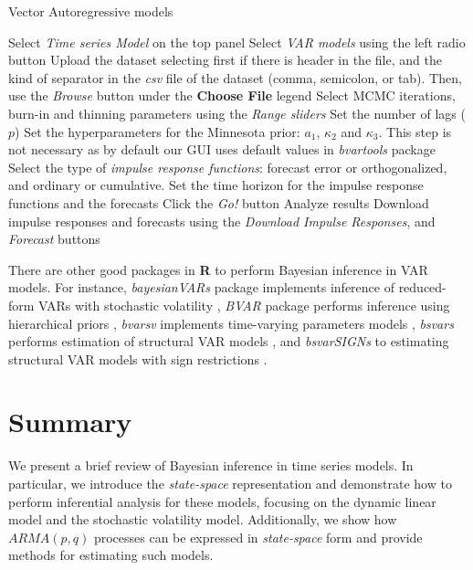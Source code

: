 \begin{algorithm}[h!]
	\caption{Vector Autoregressive models}\label{alg:VAR}
	\begin{algorithmic}[1]  		 			
		\State Select \textit{Time series Model} on the top panel
		\State Select \textit{VAR models} using the left radio button
		\State Upload the dataset selecting first if there is header in the file, and the kind of separator in the \textit{csv} file of the dataset (comma, semicolon, or tab). Then, use the \textit{Browse} button under the \textbf{Choose File} legend
		\State Select MCMC iterations, burn-in and thinning parameters using the \textit{Range sliders}
		\State Set the number of lags ($p$)
		\State Set the hyperparameters for the Minnesota prior: $a_1$, $\kappa_2$ and $\kappa_3$. This step is not necessary as by default our GUI uses default values in \textit{bvartools} package
		\State Select the type of \textit{impulse response functions}: forecast error or orthogonalized, and ordinary or cumulative.
		\State Set the time horizon for the impulse response functions and the forecasts 
		\State Click the \textit{Go!} button
		\State Analyze results
		\State Download impulse responses and forecasts using the \textit{Download Impulse Responses}, and \textit{Forecast} buttons
	\end{algorithmic} 
\end{algorithm}

There are other good packages in \textbf{R} to perform Bayesian inference in VAR models. For instance, \textit{bayesianVARs} package implements inference of reduced-form VARs with stochastic volatility \cite{Gruber2024}, \textit{BVAR} package performs inference using hierarchical priors \cite{Kuschnig2024}, \textit{bvarsv} implements time-varying parameters models \cite{Krueger2022}, \textit{bsvars} performs estimation of structural VAR models \cite{Tomasz2024}, and \textit{bsvarSIGNs} to estimating structural VAR models with sign restrictions \cite{Wang2024}. 
 
\section{Summary}\label{sec85}
We present a brief review of Bayesian inference in time series models. In particular, we introduce the \textit{state-space} representation and demonstrate how to perform inferential analysis for these models, focusing on the dynamic linear model and the stochastic volatility model. Additionally, we show how $ARMA(p,q)$ processes can be expressed in \textit{state-space} form and provide methods for estimating such models.

